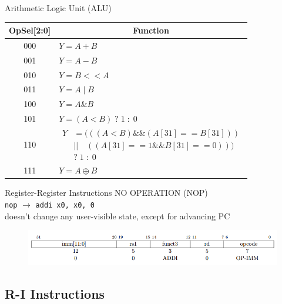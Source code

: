 \documentclass{myslide}
\begin{document}
\begin{frame}{Arithmetic Logic Unit (ALU)}
\begin{center}
\begin{tabular}{|c|l|}
    \hline
    OpSel[2:0] & \multicolumn{1}{c|}{Function}\\
    \hline
    000   & $Y=A+B$\\
    \hline
    001   & $Y=A-B$\\
    \hline
    010   & $Y=B<<A$ \\
    \hline
    011   & $Y=A\mid B$\\
    \hline
    100   & $Y=A\& B$\\
    \hline
    101   & $Y=(A<B)\;?\;1\;:\;0$\\
    \hline
    110   & \multicolumn{1}{p{7cm}|}{$\begin{aligned}
    Y&=(((A<B) \&\& (A[31] == B[31] ))\\
    &||\quad( ( A[31] ==1 \&\& B[31] == 0)))\\
    &?\;1\;:\;0
    \end{aligned}$}\\
    \hline
    111   & $Y=A\oplus B$\\
    \hline
\end{tabular}
\end{center}
\end{frame}

\begin{frame}[fragile]{Register-Register Instructions}
NO OPERATION (NOP)\\
\verb'nop' $\to$ \verb'addi x0, x0, 0'\\
doesn't change any user-visible state, except for advancing PC
\begin{figure}
\centering
\includegraphics[width=\linewidth]{fig/Lecture2/nop.PNG}
\end{figure}
\end{frame}

\subsection{R-I Instructions}
\begin{frame}
\subsectionpage
\end{frame}
\end{document}
